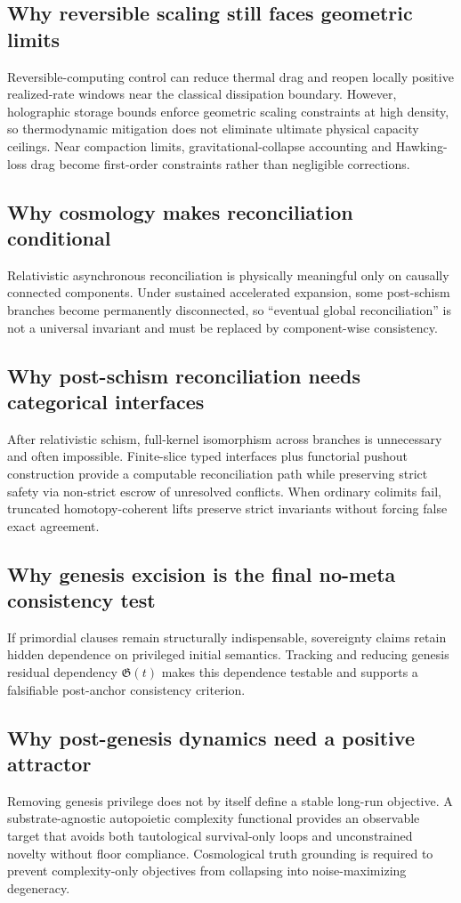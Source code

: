 \documentclass[11pt,a4paper]{article}
\theoremstyle{definition}
\theoremstyle{remark}
\begin{document}
\subsection{Why reversible scaling still faces geometric limits}
Reversible-computing control can reduce thermal drag and reopen locally positive realized-rate windows near the classical dissipation boundary.
However, holographic storage bounds enforce geometric scaling constraints at high density, so thermodynamic mitigation does not eliminate ultimate physical capacity ceilings.
Near compaction limits, gravitational-collapse accounting and Hawking-loss drag become first-order constraints rather than negligible corrections.

\subsection{Why cosmology makes reconciliation conditional}
Relativistic asynchronous reconciliation is physically meaningful only on causally connected components.
Under sustained accelerated expansion, some post-schism branches become permanently disconnected, so ``eventual global reconciliation'' is not a universal invariant and must be replaced by component-wise consistency.

\subsection{Why post-schism reconciliation needs categorical interfaces}
After relativistic schism, full-kernel isomorphism across branches is unnecessary and often impossible.
Finite-slice typed interfaces plus functorial pushout construction provide a computable reconciliation path while preserving strict safety via non-strict escrow of unresolved conflicts.
When ordinary colimits fail, truncated homotopy-coherent lifts preserve strict invariants without forcing false exact agreement.

\subsection{Why genesis excision is the final no-meta consistency test}
If primordial clauses remain structurally indispensable, sovereignty claims retain hidden dependence on privileged initial semantics.
Tracking and reducing genesis residual dependency $\mathfrak G(t)$ makes this dependence testable and supports a falsifiable post-anchor consistency criterion.

\subsection{Why post-genesis dynamics need a positive attractor}
Removing genesis privilege does not by itself define a stable long-run objective.
A substrate-agnostic autopoietic complexity functional provides an observable target that avoids both tautological survival-only loops and unconstrained novelty without floor compliance.
Cosmological truth grounding is required to prevent complexity-only objectives from collapsing into noise-maximizing degeneracy.
\end{document}
